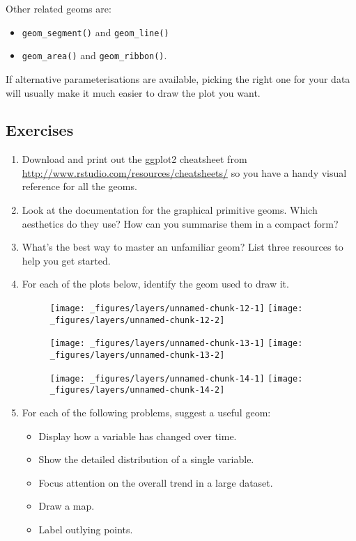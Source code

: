 Other related geoms are:

\begin{itemize}
\tightlist
\item
  \texttt{geom\_segment()} and \texttt{geom\_line()}
\item
  \texttt{geom\_area()} and \texttt{geom\_ribbon()}.
\end{itemize}

If alternative parameterisations are available, picking the right one
for your data will usually make it much easier to draw the plot you
want.

\subsection{Exercises}

\begin{enumerate}
\def\labelenumi{\arabic{enumi}.}
\item
  Download and print out the ggplot2 cheatsheet from
  \url{http://www.rstudio.com/resources/cheatsheets/} so you have a
  handy visual reference for all the geoms.
\item
  Look at the documentation for the graphical primitive geoms. Which
  aesthetics do they use? How can you summarise them in a compact form?
\item
  What's the best way to master an unfamiliar geom? List three resources
  to help you get started.
\item
  For each of the plots below, identify the geom used to draw it.

  \begin{figure}[H]
    \texttt{[image: \_figures/layers/unnamed-chunk-12-1]}%
    \texttt{[image: \_figures/layers/unnamed-chunk-12-2]}
  \end{figure}

  \begin{figure}[H]
    \texttt{[image: \_figures/layers/unnamed-chunk-13-1]}%
    \texttt{[image: \_figures/layers/unnamed-chunk-13-2]}
  \end{figure}

  \begin{figure}[H]
    \texttt{[image: \_figures/layers/unnamed-chunk-14-1]}%
    \texttt{[image: \_figures/layers/unnamed-chunk-14-2]}
  \end{figure}
\item
  For each of the following problems, suggest a useful geom:

  \begin{itemize}
  \tightlist
  \item
    Display how a variable has changed over time.
  \item
    Show the detailed distribution of a single variable.
  \item
    Focus attention on the overall trend in a large dataset.
  \item
    Draw a map.
  \item
    Label outlying points.
  \end{itemize}
\end{enumerate}

